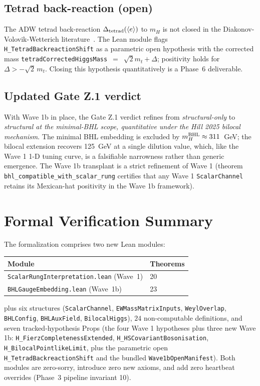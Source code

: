 \documentclass[aps,prd,twocolumn,showpacs,superscriptaddress,nofootinbib]{revtex4-2}
\begin{document}
\subsection{Tetrad back-reaction (open)}

The ADW tetrad back-reaction $\Delta_{\rm tetrad}(\langle e\rangle)$ to
$m_H$ is not closed in the Diakonov-Volovik-Wetterich
literature~\cite{ADW,WetterichSpinor2022}. The Lean module flags
\texttt{H\_TetradBackreactionShift} as a parametric open hypothesis with
the corrected mass \texttt{tetradCorrectedHiggsMass}~$=$~$\sqrt{2} m_t + \Delta$;
positivity holds for $\Delta > -\sqrt{2}\,m_t$. Closing this hypothesis
quantitatively is a Phase~6 deliverable.

\subsection{Updated Gate Z.1 verdict}

With Wave 1b in place, the Gate Z.1 verdict refines from
\emph{structural-only} to \emph{structural at the minimal-BHL scope,
quantitative under the Hill 2025 bilocal mechanism}. The minimal BHL
embedding is excluded by $m_H^{\rm BHL} \approx 311$~GeV; the bilocal
extension recovers 125~GeV at a single dilution value, which, like the
Wave 1 1-D tuning curve, is a falsifiable narrowness rather than
generic emergence. The Wave 1b transplant is a strict refinement of
Wave 1 (theorem
\texttt{bhl\_compatible\_with\_scalar\_rung} certifies that any
Wave 1 \texttt{ScalarChannel} retains its Mexican-hat positivity in
the Wave 1b framework).

\section{Formal Verification Summary}
\label{sec:formal-verification}

The formalization comprises two new Lean modules:
\begin{center}
\begin{tabular}{ll}
\toprule
Module & Theorems \\
\midrule
\texttt{ScalarRungInterpretation.lean} (Wave~1) & 20 \\
\texttt{BHLGaugeEmbedding.lean} (Wave~1b) & 23 \\
\bottomrule
\end{tabular}
\end{center}
plus six structures (\texttt{ScalarChannel}, \texttt{EWMassMatrixInputs},
\texttt{WeylOverlap}, \texttt{BHLConfig}, \texttt{BHLAuxField},
\texttt{BilocalHiggs}), $24$ non-computable definitions, and seven
tracked-hypothesis Props (the four Wave 1 hypotheses plus three new
Wave 1b: \texttt{H\_FierzCompletenessExtended},
\texttt{H\_HSCovariantBosonisation},
\texttt{H\_BilocalPointlikeLimit}, plus the parametric open
\texttt{H\_TetradBackreactionShift} and the bundled
\texttt{Wave1bOpenManifest}). Both modules are zero-sorry, introduce
zero new axioms, and add zero heartbeat overrides (Phase~3 pipeline
invariant 10).
\end{document}
